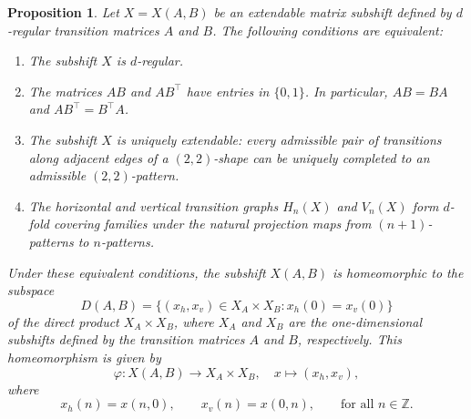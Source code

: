 \documentclass[12pt]{article}
\newtheorem{proposition}[theorem]{Proposition}
\theoremstyle{definition}
\begin{document}
\begin{proposition}\label{prop:ext_matrix_subshift_is_regular}
Let $X=X(A,B)$ be an extendable matrix subshift defined by $d$-regular transition matrices $A$ and $B$. The following conditions are equivalent:
\begin{enumerate}
  \item The subshift $X$ is $d$-regular.
  \item The matrices $AB$ and $AB^\top$ have entries in $\{0,1\}$. In particular, $AB = BA$ and $AB^\top = B^\top A$.
  \item The subshift $X$ is uniquely extendable: every admissible pair of transitions along adjacent edges of a $(2,2)$-shape can be uniquely completed to an admissible $(2,2)$-pattern.
  \item The horizontal and vertical transition graphs $H_n(X)$ and $V_n(X)$ form $d$-fold covering families under the natural projection maps from $(n+1)$-patterns to $n$-patterns.
\end{enumerate}
Under these equivalent conditions, the subshift \( X(A, B) \) is homeomorphic to the subspace
\[
D(A,B)=\{ (x_h,x_v)\in X_A\times X_B : x_h(0)=x_v(0)  \}
\]
of the direct product \( X_A \times X_B \), where \( X_A \) and \( X_B \) are the one-dimensional subshifts defined by the transition matrices \( A \) and \( B \), respectively. This homeomorphism is given by
\[
\varphi: X(A, B)\rightarrow X_A \times X_B,  \quad  x \mapsto (x_h, x_v),
\]
where
\[
x_h(n) = x(n, 0), \qquad x_v(n) = x(0, n), \qquad \text{for all } n \in \mathbb{Z}.
\]
\end{proposition}
\end{document}

